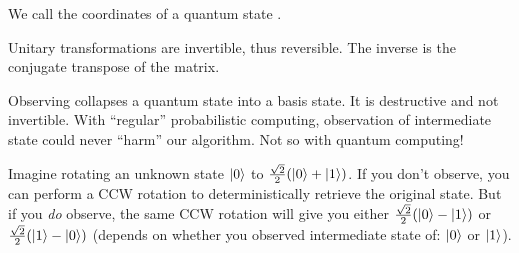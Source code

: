 \begin{remark}
  We call the coordinates of a quantum state .
\end{remark}

\begin{remark}
  Unitary transformations are invertible, thus reversible. The inverse
  is the conjugate transpose of the matrix.
\end{remark}

\begin{remark}
  Observing collapses a quantum state into a basis state. It is
  destructive and not invertible. With ``regular'' probabilistic
  computing, observation of intermediate state could never ``harm'' our
  algorithm. Not so with quantum computing!

  Imagine rotating an unknown state $|0\rangle$ to $\frac{\sqrt{2}}{2}
  \mathopen{}\left( {|0\rangle + |1\rangle} \right)\mathclose{}$. If you don't observe, you can
  perform a CCW rotation to deterministically retrieve the original
  state. But if you \emph{do} observe, the same CCW rotation will give
  you either $\frac{\sqrt{2}}{2} \mathopen{}\left( {|0\rangle - |1\rangle} \right)\mathclose{}$ or $\frac{\sqrt{2}}{2}
  \mathopen{}\left( {|1\rangle - |0\rangle} \right)\mathclose{}$ (depends on whether you observed
  intermediate state of: $|0\rangle$ or $|1\rangle$).
\end{remark}

